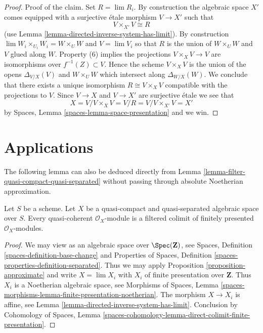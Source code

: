 \begin{proof}
\medskip\noindent
Proof of the claim. Set $R = \lim R_i$.
By construction the algebraic space $X'$ comes
equipped with a surjective \'etale morphism $V \to X'$ such that
$$
V \times_{X'} V \cong R
$$
(use Lemma \ref{lemma-directed-inverse-system-has-limit}).
By construction $\lim W_i \times_{U_i} W_i = W \times_U W$ and $V = \lim V_i$
so that $R$ is the union of $W \times_U W$ and $V$ glued along $W$.
Property (6) implies the projections $V \times_X V \to V$ are isomorphisms
over $f^{-1}(Z) \subset V$. Hence the scheme $V \times_X V$ is the union
of the opens $\Delta_{V/X}(V)$ and $W \times_U W$ which intersect
along $\Delta_{W/X}(W)$. We conclude that there exists a unique isomorphism
$R \cong V \times_X V$ compatible with the projections to $V$.
Since $V \to X$ and $V \to X'$ are surjective \'etale we see that
$$
X = V/ V \times_X V = V/R = V/V \times_{X'} V = X'
$$
by Spaces, Lemma \ref{spaces-lemma-space-presentation} and we win.
\end{proof}




\section{Applications}
\label{section-applications}

\noindent
The following lemma can also be deduced directly from
Lemma \ref{lemma-filter-quasi-compact-quasi-separated}
without passing through absolute Noetherian approximation.

\begin{lemma}
\label{lemma-colimit-finitely-presented}
Let $S$ be a scheme. Let $X$ be a quasi-compact and quasi-separated algebraic
space over $S$. Every quasi-coherent $\mathcal{O}_X$-module is a
filtered colimit of finitely presented $\mathcal{O}_X$-modules.
\end{lemma}

\begin{proof}
We may view as an algebraic space over $\Spec(\mathbf{Z})$, see
Spaces, Definition \ref{spaces-definition-base-change} and
Properties of Spaces, Definition \ref{spaces-properties-definition-separated}.
Thus we may apply Proposition \ref{proposition-approximate}
and write $X = \lim X_i$ with $X_i$ of finite presentation over $\mathbf{Z}$.
Thus $X_i$ is a Noetherian algebraic space, see
Morphisms of Spaces, Lemma
\ref{spaces-morphisms-lemma-finite-presentation-noetherian}.
The morphism $X \to X_i$ is affine, see
Lemma \ref{lemma-directed-inverse-system-has-limit}.
Conclusion by
Cohomology of Spaces, Lemma
\ref{spaces-cohomology-lemma-direct-colimit-finite-presentation}.
\end{proof}

